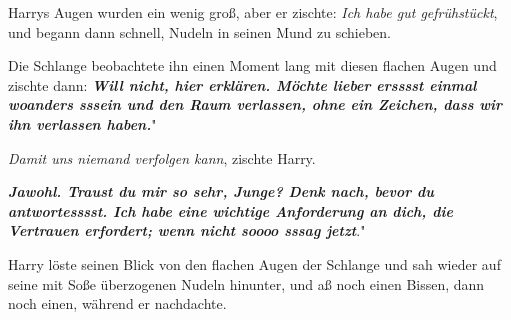 Harrys Augen wurden ein wenig groß, aber er zischte: \glqq \emph{Ich habe gut
gefrühstückt}\grqq{}, und begann dann schnell, Nudeln in seinen Mund zu
schieben.

Die Schlange beobachtete ihn einen Moment lang mit diesen flachen Augen und
zischte dann: \glqq \textbf{\emph{Will nicht, hier erklären. Möchte lieber
ersssst einmal woanders sssein und den Raum verlassen, ohne ein Zeichen, dass
wir ihn verlassen haben.}}"

\glqq \emph{Damit uns niemand verfolgen kann}\grqq{}, zischte Harry.

\glqq \textbf{\emph{Jawohl. Traust du mir so sehr, Junge? Denk nach, bevor du
antwortesssst. Ich habe eine wichtige Anforderung an dich, die Vertrauen
erfordert; wenn nicht soooo sssag jetzt}}."

Harry löste seinen Blick von den flachen Augen der Schlange und sah wieder auf
seine mit Soße überzogenen Nudeln hinunter, und aß noch einen Bissen, dann noch
einen, während er nachdachte.

